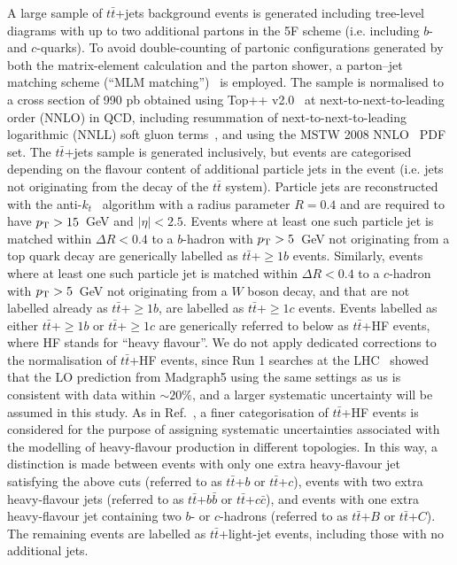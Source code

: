 \documentclass[preprintnumbers,superscriptaddress,nofootinbib,aps,prd,floatfix]{revtex4}
\newcommand{\pt}{p_{\rm{T}}}
\newcommand{\ttbar}{\ensuremath{t\bar{t}}}
\begin{document}
A large sample of $\ttbar$+jets background events is generated including tree-level diagrams with up to two additional partons  
in the 5F scheme (i.e. including $b$- and $c$-quarks). To avoid double-counting of partonic configurations generated by both the 
matrix-element  calculation and the parton shower,  a parton--jet matching scheme (``MLM matching'')~\cite{Mangano:2001xp} 
is employed. The sample is normalised to a cross section of 990 pb obtained using {\sc Top++} v2.0~\cite{Czakon:2011xx} 
at next-to-next-to-leading order (NNLO) in QCD, including resummation of next-to-next-to-leading logarithmic (NNLL) soft gluon 
terms~\cite{Cacciari:2011hy,Baernreuther:2012ws,Czakon:2012zr,Czakon:2012pz,Czakon:2013goa}, 
and using the MSTW 2008 NNLO~\cite{Martin:2009iq,Martin:2009bu} PDF set.
The $\ttbar$+jets sample is generated inclusively, but events are categorised depending
on the flavour content of additional particle jets in the event (i.e. jets not originating from
the decay of the $\ttbar$ system). Particle jets are reconstructed with the anti-$k_t$~\cite{Cacciari:2008gp,Cacciari:2005hq,Cacciari:2011ma} 
algorithm with a radius parameter $R=0.4$ and are required to have $\pt>15$~GeV and
$|\eta|<2.5$. Events where at least one such particle jet is matched within $\Delta R<0.4$ to a $b$-hadron
with $\pt>5$~GeV not originating from a top quark decay are generically labelled as $\ttbar$+$\geq$$1b$ events.
Similarly, events where at least one such particle jet is matched within $\Delta R<0.4$ to a $c$-hadron
with $\pt>5$~GeV not originating from a $W$ boson decay, and that are not labelled already as $\ttbar$+$\geq$$1b$, 
are labelled as $\ttbar$+$\geq$$1c$  events. Events labelled as either $\ttbar$+$\geq$$1b$  or
$\ttbar$+$\geq$$1c$ are generically referred to below as $\ttbar$+HF events, where HF stands for ``heavy flavour''.
We do not apply dedicated corrections to the normalisation of $\ttbar$+HF events, since Run 1 searches at the LHC~\cite{Aad:2015gra} 
showed that the LO prediction from {\sc Madgraph5} using the same settings as us is consistent with data within $\sim 20\%$,
and a larger systematic uncertainty will be assumed in this study.
As in Ref.~\cite{Aad:2015gra}, a finer categorisation of $\ttbar$+HF events is considered for the purpose of assigning systematic uncertainties
associated with the modelling of heavy-flavour production in different topologies. In this way, a distinction is
made between events with only one extra heavy-flavour jet satisfying the above cuts (referred to as $\ttbar$+$b$ or $\ttbar$+$c$),
events with two extra heavy-flavour jets (referred to as $\ttbar$+$b\bar{b}$ or $\ttbar$+$c\bar{c}$), and events
with one extra heavy-flavour jet containing two $b$- or $c$-hadrons  (referred to as $\ttbar$+$B$ or $\ttbar$+$C$).
The remaining events are labelled as $\ttbar$+light-jet events, including those with no additional jets. 
\end{document}
